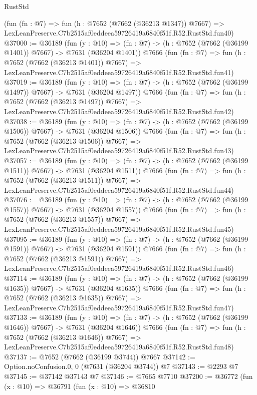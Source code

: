 \begin{lexlean}{RustStd}
\begin{coremodule}
    (fun (fn : @7) =>
    fun (h : @7652 (@7662 (@36213 @1347)) @7667) =>
    LexLeanPreserve.C7b2515af0eddeea59726419a6840f51f.R52.RustStd.fun40)
@37000 := @36189
    (fun (y : @10) => (fn : @7) -> (h : @7652 (@7662 (@36199 @1401)) @7667) -> @7631 (@36204 @1401))
    @7666
    (fun (fn : @7) =>
    fun (h : @7652 (@7662 (@36213 @1401)) @7667) =>
    LexLeanPreserve.C7b2515af0eddeea59726419a6840f51f.R52.RustStd.fun41)
@37019 := @36189
    (fun (y : @10) => (fn : @7) -> (h : @7652 (@7662 (@36199 @1497)) @7667) -> @7631 (@36204 @1497))
    @7666
    (fun (fn : @7) =>
    fun (h : @7652 (@7662 (@36213 @1497)) @7667) =>
    LexLeanPreserve.C7b2515af0eddeea59726419a6840f51f.R52.RustStd.fun42)
@37038 := @36189
    (fun (y : @10) => (fn : @7) -> (h : @7652 (@7662 (@36199 @1506)) @7667) -> @7631 (@36204 @1506))
    @7666
    (fun (fn : @7) =>
    fun (h : @7652 (@7662 (@36213 @1506)) @7667) =>
    LexLeanPreserve.C7b2515af0eddeea59726419a6840f51f.R52.RustStd.fun43)
@37057 := @36189
    (fun (y : @10) => (fn : @7) -> (h : @7652 (@7662 (@36199 @1511)) @7667) -> @7631 (@36204 @1511))
    @7666
    (fun (fn : @7) =>
    fun (h : @7652 (@7662 (@36213 @1511)) @7667) =>
    LexLeanPreserve.C7b2515af0eddeea59726419a6840f51f.R52.RustStd.fun44)
@37076 := @36189
    (fun (y : @10) => (fn : @7) -> (h : @7652 (@7662 (@36199 @1557)) @7667) -> @7631 (@36204 @1557))
    @7666
    (fun (fn : @7) =>
    fun (h : @7652 (@7662 (@36213 @1557)) @7667) =>
    LexLeanPreserve.C7b2515af0eddeea59726419a6840f51f.R52.RustStd.fun45)
@37095 := @36189
    (fun (y : @10) => (fn : @7) -> (h : @7652 (@7662 (@36199 @1591)) @7667) -> @7631 (@36204 @1591))
    @7666
    (fun (fn : @7) =>
    fun (h : @7652 (@7662 (@36213 @1591)) @7667) =>
    LexLeanPreserve.C7b2515af0eddeea59726419a6840f51f.R52.RustStd.fun46)
@37114 := @36189
    (fun (y : @10) => (fn : @7) -> (h : @7652 (@7662 (@36199 @1635)) @7667) -> @7631 (@36204 @1635))
    @7666
    (fun (fn : @7) =>
    fun (h : @7652 (@7662 (@36213 @1635)) @7667) =>
    LexLeanPreserve.C7b2515af0eddeea59726419a6840f51f.R52.RustStd.fun47)
@37133 := @36189
    (fun (y : @10) => (fn : @7) -> (h : @7652 (@7662 (@36199 @1646)) @7667) -> @7631 (@36204 @1646))
    @7666
    (fun (fn : @7) =>
    fun (h : @7652 (@7662 (@36213 @1646)) @7667) =>
    LexLeanPreserve.C7b2515af0eddeea59726419a6840f51f.R52.RustStd.fun48)
@37137 := @7652 (@7662 (@36199 @3744)) @7667
@37142 := Option.noConfusion.{0, 0} (@7631 (@36204 @3744)) @7
@37143 := @2293 @7
@37145 := @37142 @37143 @7
@37146 := @7665 @7710
@37200 := @36772
    (fun (x : @10) =>
    @36791
      (fun (x : @10) =>
      @36810

\end{coremodule}
\end{lexlean}

